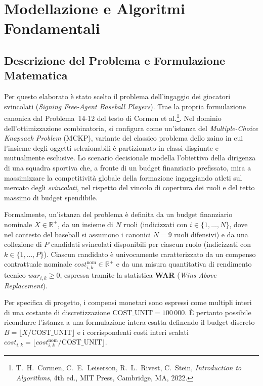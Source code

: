 \section{Modellazione e Algoritmi Fondamentali}

\subsection{Descrizione del Problema e Formulazione Matematica}
Per questo elaborato è stato scelto il problema dell'ingaggio dei giocatori svincolati (\textit{Signing Free-Agent Baseball Players}). Trae la propria formulazione canonica dal Problema~14-12 del testo di Cormen et al.\footnote{T.~H.~Cormen, C.~E.~Leiserson, R.~L.~Rivest, C.~Stein, \textit{Introduction to Algorithms}, 4th ed., MIT Press, Cambridge, MA, 2022.}. Nel dominio dell'ottimizzazione combinatoria, si configura come un'istanza del \textit{Multiple-Choice Knapsack Problem} (MCKP), variante del classico problema dello zaino in cui l'insieme degli oggetti selezionabili è partizionato in classi disgiunte e mutualmente esclusive. Lo scenario decisionale modella l'obiettivo della dirigenza di una squadra sportiva che, a fronte di un budget finanziario prefissato, mira a massimizzare la competitività globale della formazione ingaggiando atleti sul mercato degli \textit{svincolati}, nel rispetto del vincolo di copertura dei ruoli e del tetto massimo di budget spendibile.

Formalmente, un'istanza del problema è definita da un budget finanziario nominale $X \in \mathbb{R}^+$, da un insieme di $N$ ruoli (indicizzati con $i \in \{1, \dots, N\}$, dove nel contesto del baseball si assumono i canonici $N = 9$ ruoli difensivi) e da una collezione di $P$ candidati svincolati disponibili per ciascun ruolo (indicizzati con $k \in \{1, \dots, P\}$). Ciascun candidato è univocamente caratterizzato da un compenso contrattuale nominale $\mathit{cost}_{i,k}^{\text{nom}} \in \mathbb{R}^+$ e da una misura quantitativa di rendimento tecnico $\mathit{war}_{i,k} \ge 0$, espressa tramite la statistica \textbf{WAR} (\textit{Wins Above Replacement}).

Per specifica di progetto, i compensi monetari sono espressi come multipli interi di una costante di discretizzazione $\text{COST\_UNIT} = 100\,000$. È pertanto possibile ricondurre l'istanza a una formulazione intera esatta definendo il budget discreto $B = \lfloor X / \text{COST\_UNIT} \rfloor$ e i corrispondenti costi interi scalati $\mathit{cost}_{i,k} = \lfloor \mathit{cost}_{i,k}^{\text{nom}} / \text{COST\_UNIT} \rfloor$.

